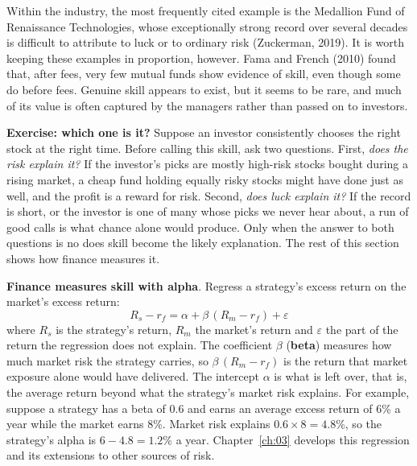\begin{itemize}
\begin{enumerate}
  \end{enumerate}

  Within the industry, the most frequently cited example is the Medallion
  Fund of Renaissance Technologies, whose exceptionally strong record over
  several decades is difficult to attribute to luck or to ordinary risk
  (Zuckerman, 2019). It is worth keeping these examples in proportion,
  however. Fama and French (2010) found that, after fees, very few mutual
  funds show evidence of skill, even though some do before fees. Genuine
  skill appears to exist, but it seems to be rare, and much of its value is
  often captured by the managers rather than passed on to investors.
  
  
\end{itemize}

\noindent\textbf{Exercise: which one is it?} Suppose an investor
consistently chooses the right stock at the right time. Before calling this
skill, ask two questions. First, \emph{does the risk explain it?} If the
investor's picks are mostly high-risk stocks bought during a rising market,
a cheap fund holding equally risky stocks might have done just as well, and
the profit is a reward for risk. Second, \emph{does luck explain it?} If the
record is short, or the investor is one of many whose picks we never hear
about, a run of good calls is what chance alone would produce. Only when the
answer to both questions is no does skill become the likely explanation. The
rest of this section shows how finance measures it.

\textbf{Finance measures skill with alpha}. Regress a strategy's excess return on the market's excess return:
\begin{equation}
  R_s - r_f = \alpha + \beta\,(R_m - r_f) + \varepsilon \nonumber
\end{equation}
where $R_s$ is the strategy's return, $R_m$ the market's return and $\varepsilon$ the part of the return the regression does not explain. The coefficient $\beta$ (\textbf{beta}) measures how much market risk the strategy carries, so $\beta\,(R_m - r_f)$ is the return that market exposure alone would have delivered. The intercept $\alpha$ is what is left over, that is, the average return beyond what the strategy's market risk explains. For example, suppose a strategy has a beta of 0.6 and earns an average excess return of 6\% a year while the market earns 8\%. Market risk explains $0.6 \times 8 = 4.8$\%, so the strategy's alpha is $6 - 4.8 = 1.2$\% a year. Chapter~\ref{ch:03} develops this regression and its extensions to other sources of risk.


